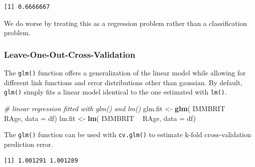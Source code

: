 \documentclass[]{article}
\newenvironment{Shaded}{\begin{snugshade}}{\end{snugshade}}
\newcommand{\CommentTok}[1]{\textcolor[rgb]{0.56,0.35,0.01}{\textit{#1}}}
\newcommand{\DataTypeTok}[1]{\textcolor[rgb]{0.13,0.29,0.53}{#1}}
\newcommand{\KeywordTok}[1]{\textcolor[rgb]{0.13,0.29,0.53}{\textbf{#1}}}
\newcommand{\NormalTok}[1]{#1}
\newcommand{\OperatorTok}[1]{\textcolor[rgb]{0.81,0.36,0.00}{\textbf{#1}}}
\newcommand{\StringTok}[1]{\textcolor[rgb]{0.31,0.60,0.02}{#1}}
\begin{document}
\begin{verbatim}
[1] 0.6666667
\end{verbatim}

We do worse by treating this as a regression problem rather than a classification problem.

\hypertarget{leave-one-out-cross-validation}{%
\subsubsection{Leave-One-Out-Cross-Validation}\label{leave-one-out-cross-validation}}

The \texttt{glm()} function offers a generalization of the linear model while allowing for different link functions and error distributions other than gaussian. By default, \texttt{glm()} simply fits a linear model identical to the one estimated with \texttt{lm()}.

\begin{Shaded}
\begin{Highlighting}[]
\CommentTok{# linear regression fitted with glm() and lm()}
\NormalTok{glm.fit <-}\StringTok{ }\KeywordTok{glm}\NormalTok{( IMMBRIT }\OperatorTok{~}\StringTok{ }\NormalTok{RAge, }\DataTypeTok{data =}\NormalTok{ df)}
\NormalTok{lm.fit <-}\StringTok{ }\KeywordTok{lm}\NormalTok{( IMMBRIT }\OperatorTok{~}\StringTok{ }\NormalTok{RAge, }\DataTypeTok{data =}\NormalTok{ df)}
\end{Highlighting}
\end{Shaded}

The \texttt{glm()} function can be used with \texttt{cv.glm()} to estimate k-fold cross-validation prediction error.

\begin{Shaded}
\end{Shaded}

\begin{verbatim}
[1] 1.001291 1.001289
\end{verbatim}

\begin{Shaded}
\end{Shaded}
\end{document}
